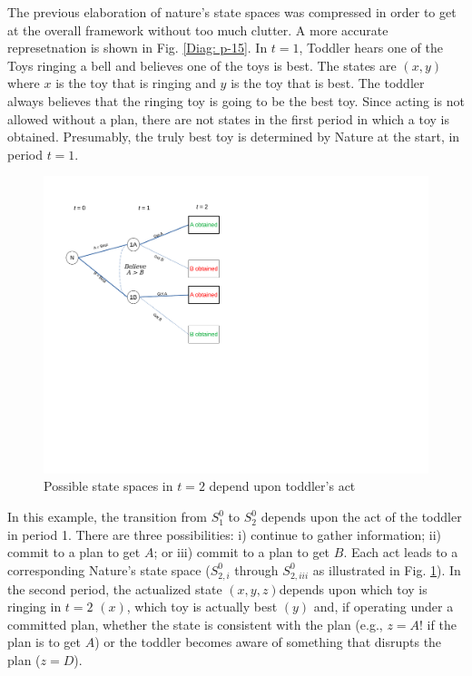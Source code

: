 \documentclass[
11pt,
titlepage,
reqno,
]{article}%
\theoremstyle{definition}
\begin{document}
The previous elaboration of nature's state spaces was compressed in order to get at the overall framework without too much clutter. A more accurate represetnation is shown in Fig. \ref{Diag: p-15}. In $t=1$, Toddler hears one of the Toys ringing a bell and believes one of the toys is best. The states are $(x,y)$ where $x$ is the toy that is ringing and $y$ is the toy that is best. The toddler always believes that the ringing toy is going to be the best toy. Since acting is not allowed without a plan, there are not states in the first period in which a toy is obtained. Presumably, the truly best toy is determined by Nature at the start, in period $t=1$.

\begin{figure}[h!]
	\centering
	\includegraphics*[page=16,trim = 0in 5in 1in 0in,scale=.65]{Awareness_Diagrams_All}
	\caption{Possible state spaces in $t=2$ depend upon toddler's act\label{Diag: p-16}}%
\end{figure}

In this example, the transition from $S^0_1$ to $S^0_2$ depends upon the act of the toddler in period 1. There are three possibilities: i) continue to gather information; ii) commit to a plan to get $A$; or iii) commit to a plan to get $B$. Each act leads to a corresponding Nature's state space ($S^0_{2,i}$ through $S^0_{2,iii}$ as illustrated in Fig. \ref{Diag: p-16}). In the second period, the actualized state $(x,y,z) $depends upon which toy is ringing in $t=2$ $(x)$,  which toy is actually best $(y)$ and, if operating under a committed plan, whether the state is consistent with the plan (e.g., $z=A!$ if the plan is to get $A$) or the toddler becomes aware of something that disrupts the plan ($z=D$).
\end{document}
